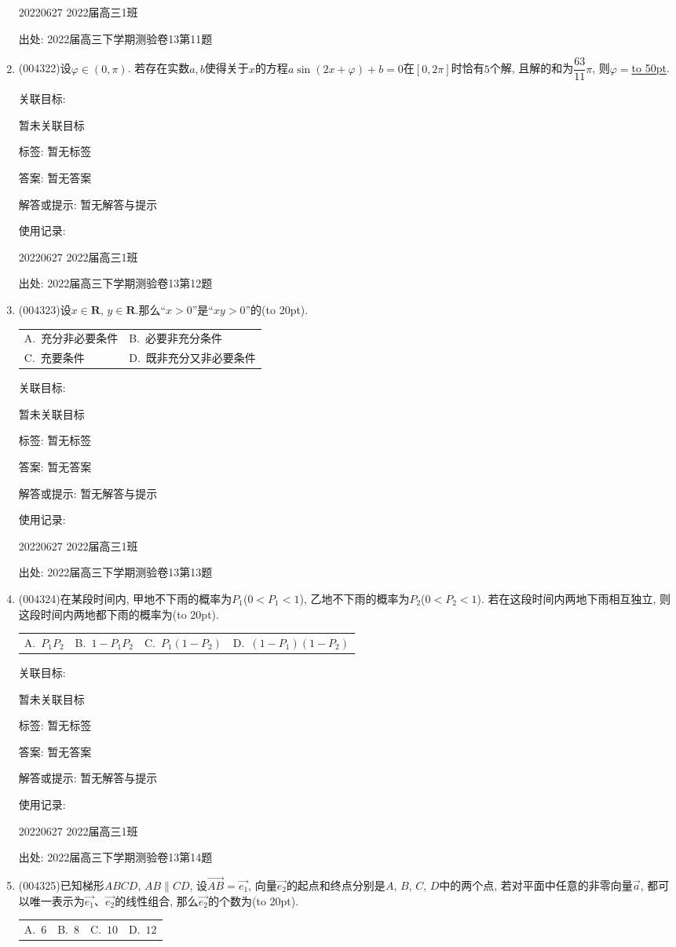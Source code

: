 \documentclass[10pt,a4paper]{article}
\newcommand{\blank}[1]{\underline{\hbox to #1pt{}}}
\newcommand{\bracket}[1]{(\hbox to #1pt{})}
\newcommand{\twoch}[4]{\par\begin{tabular}{p{.46\textwidth}p{.46\textwidth}}
A.~#1& B.~#2\\
C.~#3& D.~#4
\end{tabular}}
\newcommand{\fourch}[4]{\par\begin{tabular}{p{.23\textwidth}p{.23\textwidth}p{.23\textwidth}p{.23\textwidth}}
A.~#1 &B.~#2& C.~#3& D.~#4
\end{tabular}}
\begin{document}
\begin{enumerate}[1.]
20220627	2022届高三1班	


出处: 2022届高三下学期测验卷13第11题
\item { (004322)}设$\varphi \in (0,\pi)$. 若存在实数$a,b$使得关于$x$的方程$a\sin (2x+\varphi)+b=0$在$[0,2\pi]$时恰有$5$个解, 且解的和为$\dfrac{63}{11}\pi$, 则$\varphi =$\blank{50}.


关联目标:

暂未关联目标



标签: 暂无标签

答案: 暂无答案

解答或提示: 暂无解答与提示

使用记录:

20220627	2022届高三1班	


出处: 2022届高三下学期测验卷13第12题
\item { (004323)}设$x\in \mathbf{R}$, $y\in \mathbf{R}$.那么``$x>0$''是``$xy>0$''的\bracket{20}.
\twoch{充分非必要条件}{必要非充分条件}{充要条件}{既非充分又非必要条件}


关联目标:

暂未关联目标



标签: 暂无标签

答案: 暂无答案

解答或提示: 暂无解答与提示

使用记录:

20220627	2022届高三1班	


出处: 2022届高三下学期测验卷13第13题
\item { (004324)}在某段时间内, 甲地不下雨的概率为$P_1$($0<P_1<1$), 乙地不下雨的概率为$P_2$($0<P_2<1$). 若在这段时间内两地下雨相互独立, 则这段时间内两地都下雨的概率为\bracket{20}.
\fourch{$P_1P_2$}{$1-P_1P_2$}{$P_1(1-P_2)$}{$(1-P_1)(1-P_2)$}


关联目标:

暂未关联目标



标签: 暂无标签

答案: 暂无答案

解答或提示: 暂无解答与提示

使用记录:

20220627	2022届高三1班	


出处: 2022届高三下学期测验卷13第14题
\item { (004325)}已知梯形$ABCD$, $AB\parallel CD$, 设$\overrightarrow{AB}=\overrightarrow{e_1}$, 向量$\overrightarrow{e_2}$的起点和终点分别是$A$, $B$, $C$, $D$中的两个点, 若对平面中任意的非零向量$\overrightarrow a$, 都可以唯一表示为$\overrightarrow{e_1}$、$\overrightarrow{e_2}$的线性组合, 那么$\overrightarrow{e_2}$的个数为\bracket{20}.
\fourch{$6$}{$8$}{$10$}{$12$}



\end{enumerate}
\end{document}
